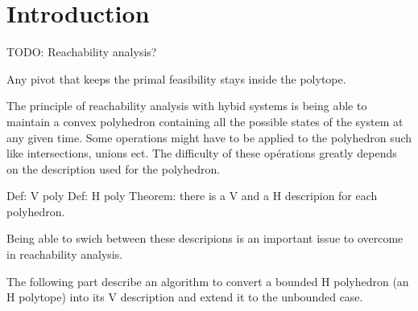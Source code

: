 \section{Introduction}

TODO: Reachability analysis?

Any pivot that keeps the primal feasibility stays inside the polytope.


The principle of reachability analysis with hybid systems is being able to maintain a convex polyhedron containing all the possible states of the system at any given time. Some operations might have to be applied to the polyhedron such like intersections, unions ect. The difficulty of these opérations greatly depends on the description used for the polyhedron.

Def: V poly
Def: H poly
Theorem: there is a V and a H descripion for each polyhedron.

Being able to swich between these descripions is an important issue to overcome in reachability analysis.

The following part describe an algorithm to convert a bounded H polyhedron (an H polytope) into its V description and extend it to the unbounded case.
